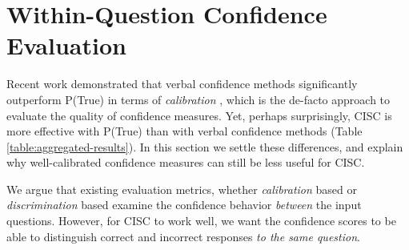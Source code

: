 \section{Within-Question Confidence Evaluation}

\label{sec:pairwise}



\begin{table}[!ht]
\centering
{}
\caption{\textbf{Comparison of different confidence extraction methods in terms of between-question and within-question confidence evaluation metrics}. 
We see that between-question metrics (ECE-t, Brier-t) are poor indicators of effective confidence extraction for CISC, while our novel WQD metric (\ref{def:wqd}) effectively predicts which confidence extraction method yields the best CISC performance.
}
\label{tab:confidence-methods}
\end{table}


Recent work demonstrated that verbal confidence methods significantly outperform P(True) in terms of \emph{calibration} \cite{tyen2023llms}, which is the de-facto approach to evaluate the quality of confidence measures. Yet, perhaps surprisingly, CISC is more effective with P(True) than with verbal confidence methods (Table \ref{table:aggregated-results}). In this section we settle these differences, and explain why well-calibrated confidence measures can still be less useful for CISC.

We argue that existing evaluation metrics, whether \emph{calibration} based \cite{kadavath2022language, tian2023just} or \emph{discrimination} based \cite{kuhn2023semantic, nguyen2024direct} examine the confidence behavior \emph{between} the input questions. However, for CISC to work well, we want the confidence scores to be able to distinguish correct and incorrect responses \emph{to the same question}. 


